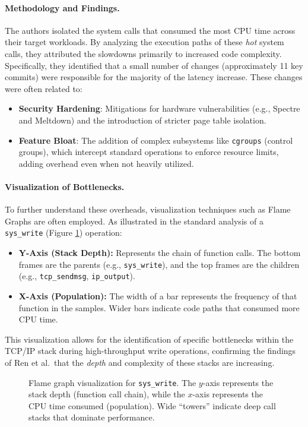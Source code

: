 \paragraph{Methodology and Findings.}
The authors isolated the system calls that consumed the most CPU time across their target workloads. By analyzing the execution paths of these \textit{hot} system calls, they attributed the slowdowns primarily to increased code complexity. 
Specifically, they identified that a small number of changes (approximately 11 key commits) were responsible for the majority of the latency increase. These changes were often related to:
\begin{itemize}
    \item \textbf{Security Hardening}: Mitigations for hardware vulnerabilities (e.g., Spectre and Meltdown) and the introduction of stricter page table isolation.
    \item \textbf{Feature Bloat}: The addition of complex subsystems like \texttt{cgroups} (control groups), which intercept standard operations to enforce resource limits, adding overhead even when not heavily utilized.
\end{itemize}

\paragraph{Visualization of Bottlenecks.}
To further understand these overheads, visualization techniques such as Flame Graphs are often employed. As illustrated in the standard analysis of a \texttt{sys\_write} (Figure \ref{fig:syswrte_flame}) operation:
\begin{itemize}
    \item \textbf{Y-Axis (Stack Depth):} Represents the chain of function calls. The bottom frames are the parents (e.g., \texttt{sys\_write}), and the top frames are the children (e.g., \texttt{tcp\_sendmsg}, \texttt{ip\_output}).
    \item \textbf{X-Axis (Population):} The width of a bar represents the frequency of that function in the samples. Wider bars indicate code paths that consumed more CPU time.
\end{itemize}
This visualization allows for the identification of specific bottlenecks within the TCP/IP stack during high-throughput write operations, confirming the findings of Ren et al.\ that the \textit{depth} and complexity of these stacks are increasing.

\begin{figure}
    \centering
    
    \caption{Flame graph visualization for \texttt{sys\_write}. The $y$-axis represents the stack depth (function call chain), while the $x$-axis represents the CPU time consumed (population). Wide ``towers'' indicate deep call stacks that dominate performance.}
    \label{fig:syswrte_flame}
\end{figure}

